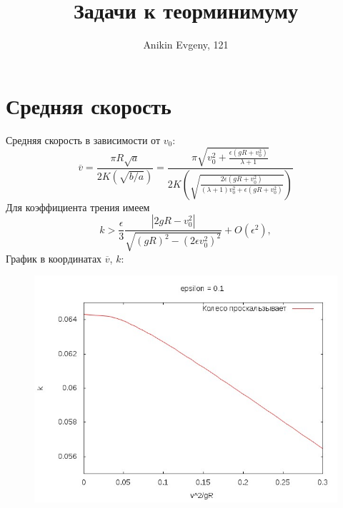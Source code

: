 \documentclass{article}
\title{Задачи к теорминимуму}
\author{Anikin Evgeny, 121}
\begin{document}
	\maketitle
	\section{Средняя скорость}
	Средняя скорость в зависимости от $v_0$:
	\begin{equation}
		\overline{v}  =	\frac{\pi R \sqrt{a}}{2K(\sqrt{b/a})} 
		= \frac{\pi\sqrt{v_0^2 + {\displaystyle \frac{\epsilon(gR + v_0^2)}{\lambda + 1}}}}
				{2 K\!\left(\sqrt{
				{\displaystyle \frac{2\epsilon(gR + v_0^2)}{(\lambda + 1) v_0^2 + 
												\epsilon(gR + v_0^2)}}
				}\right)}
	\end{equation}
	Для коэффициента трения имеем
	\begin{equation}
		k > \frac{\epsilon}{3} 
			\frac{|2gR - v_0^2|}{\sqrt{(gR)^2 - (2\epsilon v_0^2)^2}} + O(\epsilon^2),
	\end{equation}
	График в координатах $\overline{v}$, $k$:
	\begin{figure}[ht]
		\includegraphics[width=\linewidth]{overv.jpg}
	\end{figure}
	
\end{document}
